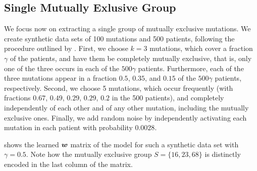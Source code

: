 \subsection{Single Mutually Exlusive Group} \label{sect:syn_single}
We focus now on extracting a single group of mutually exclusive mutations.
We create synthetic data sets of 100 mutations and 500 patients, following the procedure outlined by \cite{comet}.
First, we choose $k = 3$ mutations, which cover a fraction $\gamma$ of the patients, and have them be completely mutually exclusive, that is, only one of the three occurs in each of the $500\gamma$ patients.
Furthermore, each of the three mutations appear in a fraction $0.5$, $0.35$, and $0.15$ of the $500\gamma$ patients, respectively.
Second, we choose 5 mutations, which occur frequently (with fractions $0.67$, $0.49$, $0.29$, $0.29$, $0.2$ in the 500 patients), and completely independently of each other and of any other mutation, including the mutually exclusive ones.
Finally, we add random noise by independently activating each mutation in each patient with probability $0.0028$.

 shows the learned $\bm{w}$ matrix of the \fldc{} model for such a synthetic data set with $\gamma = 0.5$.
Note how the mutually exclusive group $S = \{16, 23, 68\}$ is distinctly encoded in the last column of the matrix.

